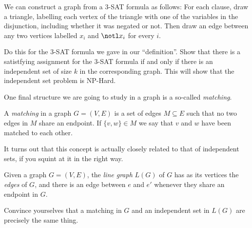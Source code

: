\documentclass[nobib]{tufte-handout}
\begin{document}
\begin{xca}
  We can construct a graph from a $3$-SAT formula as follows: For each clause, draw a triangle, labelling each vertex of the triangle with one of the variables in the disjunction, including whether it was negated or not. Then draw an edge between any two vertices labelled $x_i$ and $\notl x_i$ for every $i$.

  Do this for the $3$-SAT formula we gave in our ``definition''. Show that there is a satistfying assignment for the $3$-SAT formula if and only if there is an independent set of size $k$ in the corresponding graph. This will show that the independent set problem is NP-Hard.
\end{xca}

One final structure we are going to study in a graph is a so-called \emph{matching}.

\begin{definition}
  A \emph{matching} in a graph $G = (V,E)$ is a set of edges $M \subseteq E$ such that no two edges in $M$ share an endpoint. If $\{v, w\} \in M$ we say that $v$ and $w$ have been matched to each other.
\end{definition}

It turns out that this concept is actually closely related to that of independent sets, if you squint at it in the right way.

\begin{definition}
  Given a graph $G = (V, E)$, the \emph{line graph} $L(G)$ of $G$ has as its vertices the \emph{edges} of $G$, and there is an edge between $e$ and $e'$ whenever they share an endpoint in $G$.
\end{definition}

\begin{xca}
  Convince yourselves that a matching in $G$ and an independent set in $L(G)$ are precisely the same thing.
\end{xca}

%
%
\end{document}
